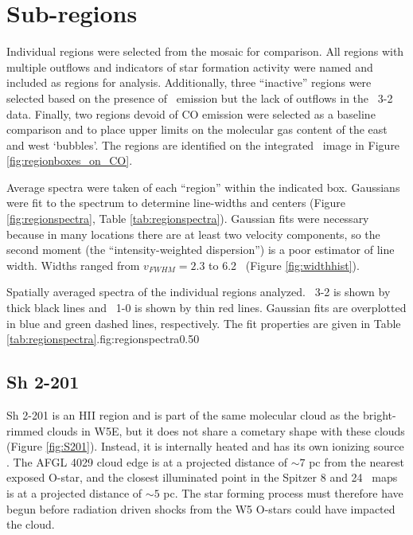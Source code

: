 \section{Sub-regions}
\label{sec:subregions}

Individual regions were selected from the mosaic for comparison.  All regions
with multiple outflows and indicators of star formation activity were named and
included as regions for analysis.  Additionally, three ``inactive'' regions were
selected based on the presence of \thirteenco\ emission but the lack of
outflows in the \twelveco\ 3-2 data.  Finally, two regions devoid of CO emission
were selected as a baseline comparison and to place upper limits on the molecular
gas content of the east and west `bubbles'.  The regions are identified on the
integrated \thirteenco\ image in Figure \ref{fig:regionboxes_on_CO}. 

Average spectra were taken of each ``region'' within the indicated box.
Gaussians were fit to the spectrum to determine line-widths and centers (Figure
\ref{fig:regionspectra}, Table \ref{tab:regionspectra}).  Gaussian fits were
necessary because in many locations there are at least two velocity components,
so the second moment (the ``intensity-weighted dispersion'') is a poor
estimator of line width.  Widths ranged from $v_{FWHM} = 2.3$ to 6.2 \kms\
(Figure \ref{fig:widthhist}).  



{Spatially averaged spectra of the individual regions analyzed.  \twelveco\ 3-2
is shown by thick black lines and \thirteenco\ 1-0 is shown by thin red lines.
Gaussian fits are overplotted in blue and green dashed lines, respectively.
The fit properties are given in Table
\ref{tab:regionspectra}.}{fig:regionspectra}{0.5}{0}


\subsection{Sh 2-201}
Sh 2-201 is an HII region and is part of the same molecular cloud as the
bright-rimmed clouds in W5E, but it does not share a cometary shape with these
clouds (Figure \ref{fig:S201}).  Instead, it is internally heated and has its
own ionizing source \citep{Felli1987}.  The AFGL 4029 cloud edge is at a projected
distance of $\sim7$ pc from the nearest exposed O-star, and the closest
illuminated point in the Spitzer 8 and 24 \um\ maps is at a projected distance
of $\sim 5$ pc.  The star forming process must therefore have begun before
radiation driven shocks from the W5 O-stars could have impacted the cloud.  

